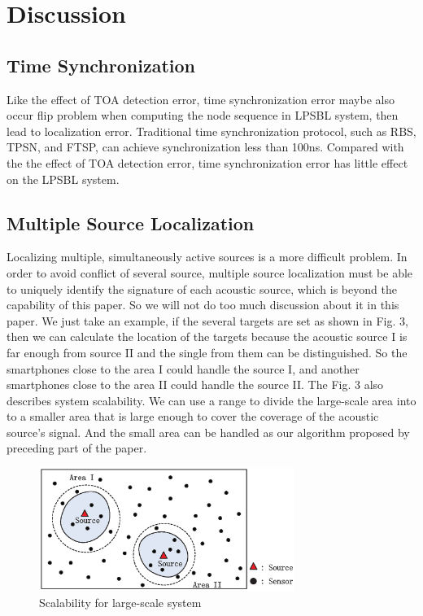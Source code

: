 \section{Discussion}

\subsection{Time Synchronization }

Like the effect of TOA detection error, time synchronization error maybe also occur flip problem when computing the node sequence in LPSBL system, then lead to localization error.
Traditional time synchronization protocol, such as RBS, TPSN, and FTSP, can achieve synchronization less than 100ns. 
Compared with the the effect of TOA detection error, time synchronization error has little effect on the LPSBL system.

\subsection{Multiple Source Localization}

Localizing multiple, simultaneously active sources is a more difficult problem. 
In order to avoid conflict of several source, multiple source localization must be able to uniquely identify the signature of each acoustic source, which is beyond the capability of this paper. 
So we will not do too much discussion about it in this paper.
We just take an example, if the several targets are set as shown in Fig. 3, then we can calculate the location of the targets 
because the acoustic source I is far enough from source II and the single from them can be distinguished. 
So the smartphones close to the area I could handle the source I, and another smartphones close to the area II could handle the source II. 
The Fig. 3 also describes system scalability.
We can use a range to divide the large-scale area into to a smaller area that is large enough to cover the coverage of the acoustic source's signal.
And the small area can be handled as our algorithm proposed by preceding part of the paper.

  \begin{figure}[ht]
            \setlength{\abovecaptionskip}{0pt}
            \centering
            \includegraphics[scale=1.4,height=4.0cm]{image/fig3.eps}
             \vspace{1mm}
			\caption{Scalability for large-scale system}
			\label{Fig3}
            \label{multiple_source_localization}
            \vspace{-5mm}
  \end{figure}


